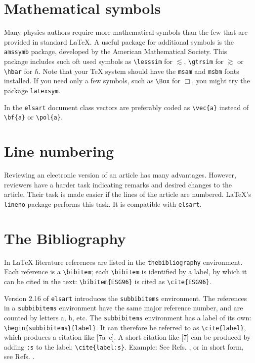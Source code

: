 \documentclass{elsart}
\begin{document}
\section{Mathematical symbols}
\label{symbols}

Many physics authors require more mathematical symbols than the
few that are provided in standard \LaTeX. A useful package for
additional symbols is the \texttt{amssymb} package, developed by the American
Mathematical Society.  This package includes such oft used symbols as
\verb|\lesssim| for $\lesssim$, \verb|\gtrsim| for $\gtrsim$ or
\verb|\hbar| for $\hbar$.  Note that your \TeX{} system should have
the \texttt{msam} and \texttt{msbm} fonts installed.
If you need only a few symbols, such as \verb|\Box| for $\Box$,
you might try the package \texttt{latexsym}.

In the \texttt{elsart} document class vectors are preferably coded as 
\verb|\vec{a}| instead of \verb|\bf{a}| or \verb|\pol{a}|.

\section{Line numbering}
\label{linenumbering}

\begin{linenumbers}
Reviewing an electronic version of an article has many
advantages. However, reviewers have a harder task indicating remarks
and desired changes to the article. Their task is made easier if the
lines of the article are numbered. \LaTeX's \texttt{lineno} package
performs this task. It is compatible with \texttt{elsart}.
\end{linenumbers}

\section{The Bibliography}
\label{thebib}

In \LaTeX{} literature references are listed in the
\verb|thebibliography| environment. Each reference is a
\verb|\bibitem|; each \verb|\bibitem| is identified by a label, by
which it can be cited in the text: \verb|\bibitem{ESG96}| is cited as
\verb|\cite{ESG96}|.

Version 2.16 of \texttt{elsart} introduces the \texttt{subbibitems}
environment. The references in a \texttt{subbibitems} environment
have the same major reference number, and are counted by letters
a, b, etc. The \texttt{subbibitems} environment has
a label of its own: \verb|\begin{subbibitems}{label}|. 
It can therefore be referred to as \verb|\cite{label}|, which produces
a citation like [7a--c]. A short citation like [7] can be produced by
adding \texttt{:s} to the label: \verb|\cite{label:s}|. Example: See
Refs. \cite{Lee}, or in short form, see Refs. \cite{Lee:s}.
\end{document}
